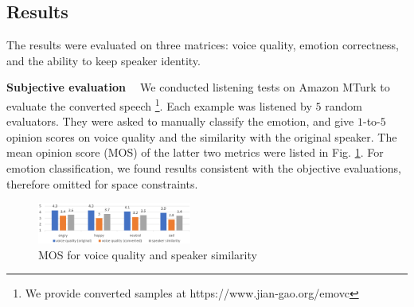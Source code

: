 \documentclass{article}
\begin{document}
\subsection{Results}
The results were evaluated on three matrices: voice quality, emotion correctness, and the ability to keep speaker identity.

\noindent \textbf{Subjective evaluation \ } We conducted listening tests on Amazon MTurk to evaluate the converted speech \footnote{We provide converted samples at https://www.jian-gao.org/emovc}. Each example was listened by $5$ random evaluators. They were asked to manually classify the emotion, and give $1$-to-$5$ opinion scores on voice quality and the similarity with the original speaker. The mean opinion score (MOS) of the latter two metrics were listed in Fig. \ref{fig:mos}. For emotion classification, we found results consistent with the objective evaluations, therefore omitted for space constraints.



\begin{figure}[htb]
\center
\includegraphics[width=0.45\textwidth]{FIG/MOS}
\caption{MOS for voice quality and speaker similarity}
\label{fig:mos}
\end{figure}

\end{document}
